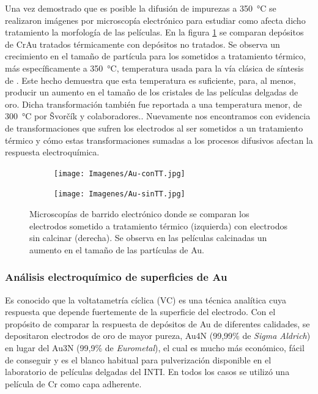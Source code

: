 {{			 Una vez demostrado que es posible la difusión de impurezas a \SI{350}{\celsius} se realizaron imágenes por microscopía electrónico para estudiar como afecta dicho tratamiento la morfología de las películas. En la figura \ref{fig:Au_compTT} se comparan depósitos de Cr\textbar Au tratados térmicamente con depósitos no tratados. Se observa un crecimiento en el tamaño de partícula para los sometidos a tratamiento térmico, más específicamente a \SI{350}{\celsius}, temperatura usada para la vía clásica de síntesis de \pdm. Este hecho demuestra que esta temperatura es suficiente, para, al menos, producir un aumento en el tamaño de los cristales de las películas delgadas de oro. Dicha transformación también fue reportada a una temperatura menor, de \SI{300}{\celsius} por \v{S}vor\v{c}\'ik y colaboradores.}\cite{Svorcik2010}. Nuevamente nos encontramos con evidencia de transformaciones que sufren los electrodos al ser sometidos a un tratamiento térmico y cómo estas transformaciones sumadas a los procesos difusivos afectan la respuesta electroquímica.

			 		\begin{figure}[th]
		 	   	    \begin{subfigure}[t]{0.49\textwidth}
			       	\texttt{[image: Imagenes/Au-conTT.jpg]}
			   		\end{subfigure}
			   		\begin{subfigure}[t]{0.49\textwidth}
			   	    \texttt{[image: Imagenes/Au-sinTT.jpg]}
			   		\end{subfigure}
					 \caption[Microscopía comparativa electrodos Au]{Microscopías de barrido electrónico donde se comparan los electrodos sometido a tratamiento térmico (izquierda) con electrodos sin calcinar (derecha). Se observa en las películas calcinadas un aumento en el tamaño de las partículas de Au.}
					 \label{fig:Au_compTT}	
				     \end{figure}
	
		\subsubsection{Análisis electroquímico de superficies de Au}

			Es conocido que la voltatametría cíclica (VC) es una técnica analítica cuya respuesta que depende fuertemente de la superficie del electrodo.\cite{Wi2000,Pumera2007,Gewirth2004,Villullas2000} Con el propósito de comparar la respuesta de depósitos de Au de diferentes calidades, se depositaron electrodos de oro de mayor pureza, Au4N (99,99\% de \textit{Sigma Aldrich}) en lugar del Au3N (99,9\% de \textit{Eurometal}), el cual es mucho más económico, fácil de conseguir y es el blanco habitual para pulverización disponible en el laboratorio de películas delgadas del INTI. En todos los casos se utilizó una película de Cr como capa adherente.

}
